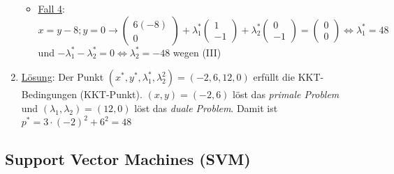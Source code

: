 \begin{enumerate}
\begin{itemize}
                \item \underline{Fall 4}: \(x=y-8; y=0 \rightarrow \begin{pmatrix}
                    6(-8)\\0
                    \end{pmatrix} + \lambda_1^* \begin{pmatrix}
                        1\\-1
                    \end{pmatrix} + \lambda_2^* \begin{pmatrix}
                        0\\-1
                    \end{pmatrix}
                     = \begin{pmatrix}
                        0\\0
                    \end{pmatrix}\Leftrightarrow \lambda_1^*=48\) und \(-\lambda_1^* - \lambda_2^* = 0 \Leftrightarrow \lambda_2^*=-48\) \Lightning \hspace{0.1em} wegen (III)
    

        \end{itemize} 
    \item \underline{Lösung}: Der Punkt \((x^*, y^*, \lambda_1^*, \lambda_2^2) = (-2, 6, 12, 0)\) erfüllt die KKT-Bedingungen (KKT-Punkt). \((x, y)=(-2,6)\) löst das \emph{primale Problem} und \((\lambda_1, \lambda_2)=(12,0)\) löst das \emph{duale Problem}. Damit ist \(p^*=3\cdot (-2)^2+6^2=48\)\\
\end{enumerate}


\subsection{Support Vector Machines (SVM)}

